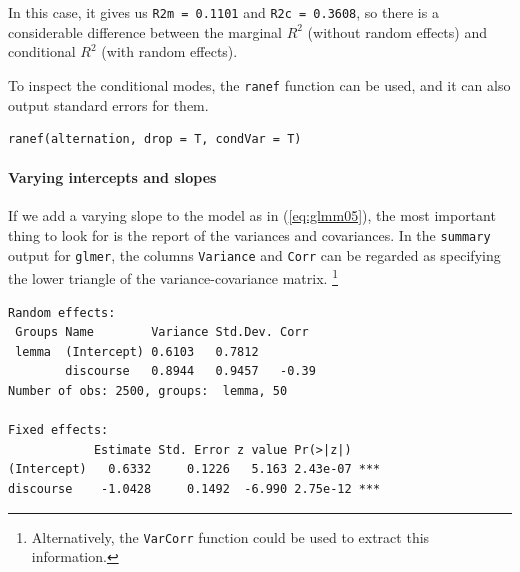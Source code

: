 \documentclass[a4paper,12pt]{article}
\begin{document}
In this case, it gives us \texttt{R2m = 0.1101} and \texttt{R2c = 0.3608}, so there is a considerable difference between the marginal $R^2$ (without random effects) and conditional $R^2$ (with random effects).

To inspect the conditional modes, the \texttt{ranef} function can be used, and it can also output standard errors for them.

\vspace{0.5\baselineskip}

\begin{lstlisting}
ranef(alternation, drop = T, condVar = T)
\end{lstlisting}

% 
% 
% 

\paragraph{Varying intercepts and slopes}

If we add a varying slope to the model as in (\ref{eq:glmm05}), the most important thing to look for is the report of the variances and covariances.
In the \texttt{summary} output for \texttt{glmer}, the columns \texttt{Variance} and \texttt{Corr} can be regarded as specifying the lower triangle of the variance-covariance matrix.%
\footnote{Alternatively, the \texttt{VarCorr} function could be used to extract this information.}

\vspace{0.5\baselineskip}

\begin{lstlisting}
Random effects:
 Groups Name        Variance Std.Dev. Corr 
 lemma  (Intercept) 0.6103   0.7812        
        discourse   0.8944   0.9457   -0.39
Number of obs: 2500, groups:  lemma, 50

Fixed effects:
            Estimate Std. Error z value Pr(>|z|)    
(Intercept)   0.6332     0.1226   5.163 2.43e-07 ***
discourse    -1.0428     0.1492  -6.990 2.75e-12 ***
\end{lstlisting}
\end{document}
